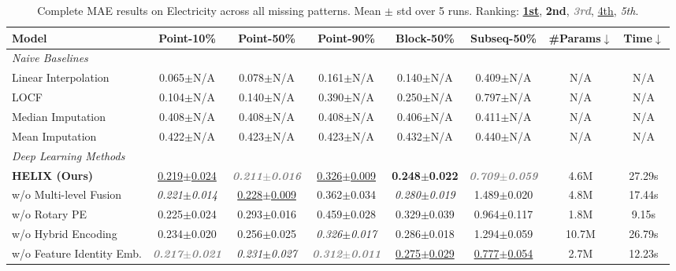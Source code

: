 \begin{table}[h]
    \caption{Complete MAE results on Electricity across all missing patterns. Mean $\pm$ std over 5 runs. Ranking: \underline{\textbf{1st}}, \textbf{2nd}, \textcolor{gray}{\textbf{\textit{3rd}}}, \underline{4th}, \textit{5th}.}
    \label{tab:full_electricity}
    \centering
    \begin{footnotesize}
    \begin{tabular}{l|ccccc|cc}
        \toprule
        \textbf{Model} & \textbf{Point-10\%} & \textbf{Point-50\%} & \textbf{Point-90\%} & \textbf{Block-50\%} & \textbf{Subseq-50\%} & \textbf{\#Params}$\downarrow$ & \textbf{Time}$\downarrow$ \\
        \midrule
        \multicolumn{8}{l}{\textit{Naive Baselines}} \\
        Linear Interpolation & 0.065$\pm$N/A & 0.078$\pm$N/A & 0.161$\pm$N/A & 0.140$\pm$N/A & 0.409$\pm$N/A & N/A & N/A \\
        LOCF & 0.104$\pm$N/A & 0.140$\pm$N/A & 0.390$\pm$N/A & 0.250$\pm$N/A & 0.797$\pm$N/A & N/A & N/A \\
        Median Imputation & 0.408$\pm$N/A & 0.408$\pm$N/A & 0.408$\pm$N/A & 0.406$\pm$N/A & 0.411$\pm$N/A & N/A & N/A \\
        Mean Imputation & 0.422$\pm$N/A & 0.423$\pm$N/A & 0.423$\pm$N/A & 0.432$\pm$N/A & 0.440$\pm$N/A & N/A & N/A \\
        \midrule
        \multicolumn{8}{l}{\textit{Deep Learning Methods}} \\
        \textbf{HELIX (Ours)} & \underline{0.219$\pm$0.024} & \textcolor{gray}{\textbf{\textit{0.211$\pm$0.016}}} & \underline{0.326$\pm$0.009} & \textbf{0.248$\pm$0.022} & \textcolor{gray}{\textbf{\textit{0.709$\pm$0.059}}} & 4.6M & 27.29s \\
        w/o Multi-level Fusion & \textit{0.221$\pm$0.014} & \underline{0.228$\pm$0.009} & 0.362$\pm$0.034 & \textit{0.280$\pm$0.019} & 1.489$\pm$0.020 & 4.8M & 17.44s \\
        w/o Rotary PE & 0.225$\pm$0.024 & 0.293$\pm$0.016 & 0.459$\pm$0.028 & 0.329$\pm$0.039 & 0.964$\pm$0.117 & 1.8M & 9.15s \\
        w/o Hybrid Encoding & 0.234$\pm$0.020 & 0.256$\pm$0.025 & \textit{0.326$\pm$0.017} & 0.286$\pm$0.018 & 1.294$\pm$0.059 & 10.7M & 26.79s \\
        w/o Feature Identity Emb. & \textcolor{gray}{\textbf{\textit{0.217$\pm$0.021}}} & \textit{0.231$\pm$0.027} & \textcolor{gray}{\textbf{\textit{0.312$\pm$0.011}}} & \underline{0.275$\pm$0.029} & \underline{0.777$\pm$0.054} & 2.7M & 12.23s \\

\end{tabular}
\end{footnotesize}
\end{table}
